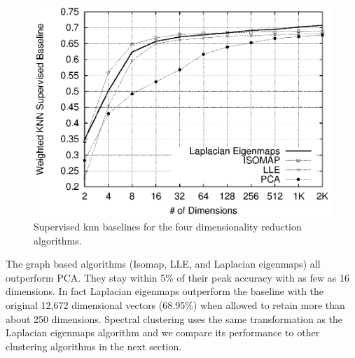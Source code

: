 \begin{figure}[h]
\includegraphics[width=.5\textwidth]{baseline_graph_mono.eps}
\caption{Supervised knn baselines for the four dimensionality
  reduction algorithms.}
\label{fig:dimreduce}
\end{figure}

% 

The graph based algorithms (Isomap, LLE, and Laplacian eigenmaps) all
outperform PCA.  They stay within 5\% of their peak accuracy with as
few as 16 dimensions.  In fact Laplacian eigenmaps outperform the
baseline with the original 12,672 dimensional vectors (68.95\%) when
allowed to retain more than about 250 dimensions.  Spectral clustering
uses the same transformation as the Laplacian eigenmaps algorithm and
we compare its performance to other clustering algorithms in the next
section.

